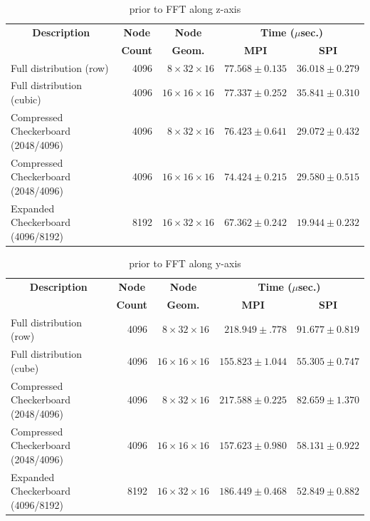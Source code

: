 \begin{table}
\begin{tabular}{|l|r|r|r|r|} \hline
\multicolumn{1}{|c|}{\bf Description} & \multicolumn{1}{c|}{\bf Node} & \multicolumn{1}{c|}{\bf Node} & \multicolumn{2}{|c|}{\bf Time
  ($\mu$sec.)} \\ \cline{4-5}
& \multicolumn{1}{c|}{\bf Count}& \multicolumn{1}{c|}{\bf Geom.}&
  \multicolumn{1}{c|}{\bf MPI} & \multicolumn{1}{c|}{\bf SPI} \\ \hline
Full distribution (row)   & 4096 & $8 \times 32\times 16$ & $77.568 \pm 0.135$ & $36.018 \pm 0.279$ \\ \hline
Full distribution (cubic) & 4096 & $16\times 16\times 16$ & $77.337 \pm 0.252$ & $35.841 \pm 0.310$ \\ \hline
Compressed Checkerboard (2048/4096)  & 4096 & $8 \times 32\times 16$ & $76.423 \pm 0.641$ & $29.072 \pm 0.432$ \\ \hline
Compressed Checkerboard (2048/4096)  & 4096 & $16\times 16\times 16$ & $74.424 \pm 0.215$ & $29.580 \pm 0.515$ \\ \hline
Expanded Checkerboard (4096/8192) & 8192  & $16\times 32\times 16$ & $67.362 \pm 0.242$ & $19.944 \pm 0.232$\\
\hline
\end{tabular}
\caption{\Alltoall prior to FFT along z-axis}
\label{tab:a2a_z}
\end{table}


\begin{table}
\begin{tabular}{|l|r|r|r|r|} \hline
\multicolumn{1}{|c|}{\bf Description} & \multicolumn{1}{c|}{\bf Node} & \multicolumn{1}{c|}{\bf Node} & \multicolumn{2}{|c|}{\bf Time
  ($\mu$sec.)} \\ \cline{4-5}
& \multicolumn{1}{c|}{\bf Count}& \multicolumn{1}{c|}{\bf Geom.}&
  \multicolumn{1}{c|}{\bf MPI} & \multicolumn{1}{c|}{\bf SPI} \\ \hline
Full distribution (row)  & 4096 & $8\times  32\times 16$ & $218.949 \pm .778 $ & $91.677 \pm 0.819$ \\ \hline
Full distribution (cube) & 4096 & $16\times 16\times 16$ & $155.823 \pm 1.044$ & $55.305 \pm 0.747$ \\ \hline
Compressed Checkerboard (2048/4096) & 4096 & $ 8\times 32\times 16$ & $217.588 \pm 0.225$ & $82.659 \pm 1.370$ \\ \hline
Compressed Checkerboard (2048/4096) & 4096 & $16\times 16\times 16$ & $157.623 \pm 0.980$ & $58.131 \pm 0.922$ \\ \hline
Expanded Checkerboard (4096/8192) & 8192 & $16\times 32\times 16$ & $186.449 \pm 0.468$ & $52.849 \pm 0.882$ \\ \hline
\end{tabular}
\caption{\Alltoall prior to FFT along y-axis}
\label{tab:a2a_y}
\end{table}

